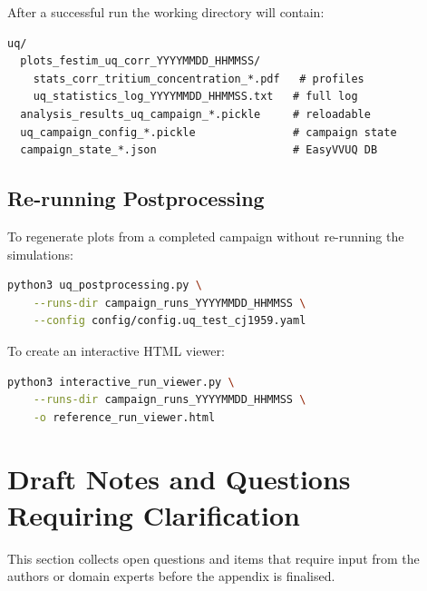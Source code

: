 \documentclass[11pt,a4paper]{article}
\begin{document}
After a successful run the working directory will contain:

\begin{lstlisting}[basicstyle=\ttfamily\footnotesize]
uq/
  plots_festim_uq_corr_YYYYMMDD_HHMMSS/
    stats_corr_tritium_concentration_*.pdf   # profiles
    uq_statistics_log_YYYYMMDD_HHMMSS.txt   # full log
  analysis_results_uq_campaign_*.pickle     # reloadable
  uq_campaign_config_*.pickle               # campaign state
  campaign_state_*.json                     # EasyVVUQ DB
\end{lstlisting}

\subsection{Re-running Postprocessing}

To regenerate plots from a completed campaign without re-running the
simulations:

\begin{lstlisting}[language=bash]
python3 uq_postprocessing.py \
    --runs-dir campaign_runs_YYYYMMDD_HHMMSS \
    --config config/config.uq_test_cj1959.yaml
\end{lstlisting}

\noindent
To create an interactive HTML viewer:

\begin{lstlisting}[language=bash]
python3 interactive_run_viewer.py \
    --runs-dir campaign_runs_YYYYMMDD_HHMMSS \
    -o reference_run_viewer.html
\end{lstlisting}


\section{Draft Notes and Questions Requiring Clarification}
\label{sec:questions}

This section collects open questions and items that require input from
the authors or domain experts before the appendix is finalised.
\end{document}
